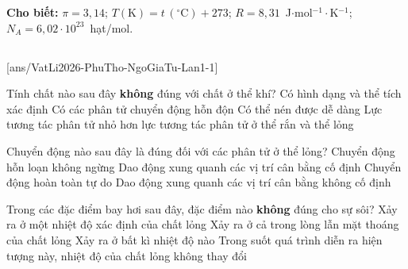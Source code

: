 \def\CheDo{solcolor}%
\def\tenchuong{THPT Ngô Gia Tự, Phú Thọ -- Lần 1}
\def\thuonghieu{VẬT LÍ 12 -- Eduzy.com.vn}
\def\TachCauDS{1}
\def\TachCauLG{1}




	\noindent\textbf{Cho biết:} $\pi=3{,}14$; $T(\text{K})=t\,(^\circ\text{C})+273$; $R=8{,}31$~J$\cdot$mol$^{-1}\cdot$K$^{-1}$; $N_A=6{,}02\cdot 10^{23}$~hạt/mol.

	\noindent
	\subsection*{}
	\setcounter{ex}{0}
	[ans/VatLi2026-PhuTho-NgoGiaTu-Lan1-1]

	\begin{ex}%
		Tính chất nào sau đây \textbf{không} đúng với chất ở thể khí?
		\choice
		{\True Có hình dạng và thể tích xác định}
		{Có các phân tử chuyển động hỗn độn}
		{Có thể nén được dễ dàng}
		{Lực tương tác phân tử nhỏ hơn lực tương tác phân tử ở thể rắn và thể lỏng}
	\end{ex}

	\begin{ex}%
		Chuyển động nào sau đây là đúng đối với các phân tử ở thể lỏng?
		\choice
		{Chuyển động hỗn loạn không ngừng}
		{Dao động xung quanh các vị trí cân bằng cố định}
		{Chuyển động hoàn toàn tự do}
		{\True Dao động xung quanh các vị trí cân bằng không cố định}
	\end{ex}

	\begin{ex}%
		Trong các đặc điểm bay hơi sau đây, đặc điểm nào \textbf{không} đúng cho sự sôi?
		\choice
		{Xảy ra ở một nhiệt độ xác định của chất lỏng}
		{Xảy ra ở cả trong lòng lẫn mặt thoáng của chất lỏng}
		{\True Xảy ra ở bất kì nhiệt độ nào}
		{Trong suốt quá trình diễn ra hiện tượng này, nhiệt độ của chất lỏng không thay đổi}
	\end{ex}


